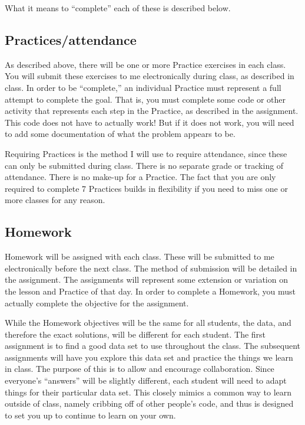 \documentclass{tufte-handout}
\begin{document}
What it means to ``complete'' each of these is described below.
\subsection*{Practices/attendance}
\label{sec-6-2}

As described above, there will be one or more Practice exercises in each class. You will submit these exercises to me electronically during class, as described in class.  In order to be ``complete,'' an individual Practice must represent a full attempt to complete the goal.  That is, you must complete some code or other activity that represents each step in the Practice, as described in the assignment.  This code does not have to actually work!  But if it does not work, you will need to add some documentation of what the problem appears to be.

Requiring Practices is the method I will use to require attendance, since these can only be submitted during class.  There is no separate grade or tracking of attendance.  There is no make-up for a Practice.  The fact that you are only required to complete 7 Practices builds in flexibility if you need to miss one or more classes for any reason. 
\subsection*{Homework}
\label{sec-6-3}

Homework will be assigned with each class.  These will be submitted to me electronically before the next class.  The method of submission will be detailed in the assignment. The assignments will represent some extension or variation on the lesson and Practice of that day.  In order to complete a Homework, you must actually complete the objective for the assignment.  

While the Homework objectives will be the same for all students, the data, and therefore the exact solutions, will be different for each student.  The first assignment is to find a good data set to use throughout the class.  The subsequent assignments will have you explore this data set and practice the things we learn in class.  The purpose of this is to allow and encourage collaboration.  Since everyone's ``answers'' will be slightly different, each student will need to adapt things for their particular data set.  This closely mimics a common way to learn outside of class, namely cribbing off of other people's code, and thus is designed to set you up to continue to learn on your own.
\end{document}
